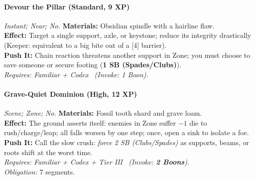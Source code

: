 \paragraph{Devour the Pillar (Standard, 9 XP)} \emph{Instant; Near; No.}
\textbf{Materials:} Obsidian spindle with a hairline flaw.\\
\textbf{Effect:} Target a single support, axle, or keystone; reduce its integrity drastically (Keeper: equivalent to a big bite out of a [4] barrier).\\
\textbf{Push It:} Chain reaction threatens another support in Zone; you must choose to save someone or secure footing (\textbf{1 SB (Spades/Clubs)}).\\
\emph{Requires: Familiar + Codex \ (\textit{Invoke:} 1 Boon).}

\paragraph{Grave-Quiet Dominion (High, 12 XP)} \emph{Scene; Zone; No.}
\textbf{Materials:} Fossil tooth shard and grave loam.\\
\textbf{Effect:} The ground asserts itself: enemies in Zone suffer \(-1\) die to rush/charge/leap; all falls worsen by one step; once, open a sink to isolate a foe.\\
\textbf{Push It:} Call the slow crush: \emph{force 2 SB (Clubs/Spades)} as supports, beams, or roots shift at the worst time.\\
\emph{Requires: Familiar + Codex + Tier III \ (\textit{Invoke:} \textbf{2 Boons}).}\\
\emph{Obligation:} 7 segments.
